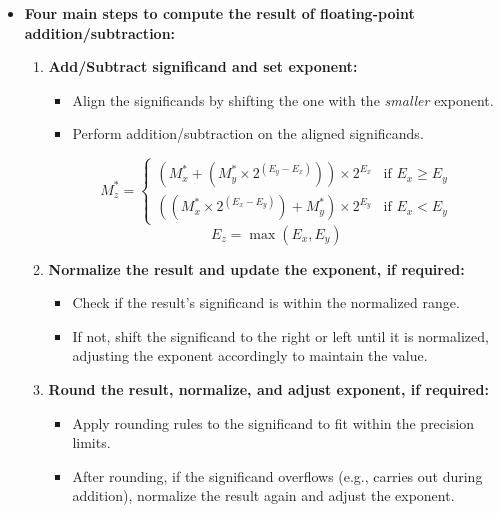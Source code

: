 \documentclass[12pt,openany, tikz,border=10pt]{book}
\begin{document}
			      	
			      	\newpage
			      	\begin{itemize}
			      		\item[] \textbf{Four main steps to compute the result of floating-point addition/subtraction:}
			      		      \begin{enumerate}
			      		      	\item \textbf{Add/Subtract significand and set exponent:}
			      		      	      \begin{itemize}
			      		      	      	\item Align the significands by shifting the one with the \textit{smaller} exponent.
			      		      	      	\item Perform addition/subtraction on the aligned significands.
			      		      	      \end{itemize}
			      		      	      \[
			      		      	      	M_z^* = 
			      		      	      	\begin{cases} 
			      		      	      		(M_x^* + (M_y^* \times 2^{(E_y - E_x)})) \times 2^{E_x} & \text{if } E_x \geq E_y \\
			      		      	      		((M_x^* \times 2^{(E_x - E_y)}) + M_y^*) \times 2^{E_y} & \text{if } E_x < E_y    
			      		      	      	\end{cases}
			      		      	      \]
			      		      	      \[
			      		      	      	E_z = \max(E_x, E_y)
			      		      	      \]
			      		      	            
			      		      	\item \textbf{Normalize the result and update the exponent, if required:}
			      		      	      \begin{itemize}
			      		      	      	\item Check if the result's significand is within the normalized range.
			      		      	      	\item If not, shift the significand to the right or left until it is normalized, adjusting the exponent accordingly to maintain the value.
			      		      	      \end{itemize}
			      		      	          
			      		      	\item \textbf{Round the result, normalize, and adjust exponent, if required:}
			      		      	      \begin{itemize}
			      		      	      	\item Apply rounding rules to the significand to fit within the precision limits.
			      		      	      	\item After rounding, if the significand overflows (e.g., carries out during addition), normalize the result again and adjust the exponent.
			      		      	      \end{itemize}
			      		      	          

\end{enumerate}
\end{itemize}
\end{document}
